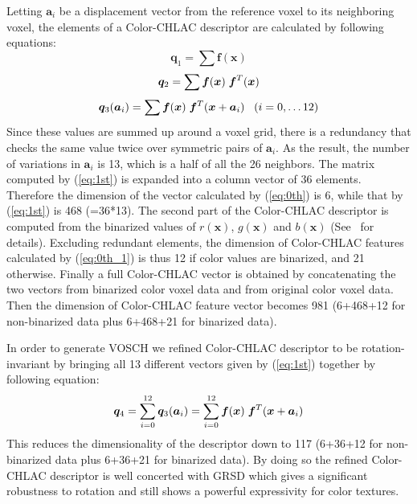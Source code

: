 \documentclass[conference]{sty/IEEEtran}
\begin{document}
%
Letting ${\bm a_i}$ be a displacement vector from the reference voxel to its neighboring voxel, 
the elements of a Color-CHLAC descriptor are calculated by following equations:
\begin{equation}\label{eq:0th}
  {\bm q_1} = \sum \bm{f}({\bm x})
\end{equation}
\begin{equation}\label{eq:0th_1}
  {\bm q_2} = \sum \bm{f}({\bm x}) \hspace{1mm}\bm{f}^T({\bm x}) \\
\end{equation}
\begin{equation}\label{eq:1st}
  {\bm q_3}({\bm a}_i) = \sum \bm{f}({\bm x}) \hspace{1mm}\bm{f}^T({\bm x}+{\bm a_i}) \;\;\; (i=0, \dots 12) \\
\end{equation}
%
Since these values are summed up around a voxel grid, there is a redundancy that checks 
the same value twice over symmetric pairs of ${\bm a_i}$. 
As the result, the number of variations in ${\bm a_i}$ is 13, which is a half of all the 26 neighbors.
The matrix computed by (\ref{eq:1st}) is expanded into a column vector of 36 elements.
Therefore the dimension of the vector calculated by (\ref{eq:0th}) is 6, while that by 
(\ref{eq:1st}) is 468 (=36*13).
The second part of the Color-CHLAC descriptor is computed from the binarized values of $r(\bm{x})$, $g(\bm{x})$ 
and $b(\bm{x})$ (See~\cite{kanezaki2010icra} for details). 
Excluding redundant elements, the dimension of Color-CHLAC features calculated by (\ref{eq:0th_1}) 
is thus 12 if color values are binarized, and 21 otherwise. 
Finally a full Color-CHLAC vector is obtained by concatenating the two vectors from binarized 
color voxel data and from original color voxel data. Then the dimension of Color-CHLAC feature vector 
becomes 981 (6+468+12 for non-binarized data plus 6+468+21 for binarized data). 

In order to generate VOSCH we refined Color-CHLAC descriptor to be rotation-invariant by bringing all  
13 different vectors given by (\ref{eq:1st}) together by following equation: 
\begin{equation}\label{eq:1st_new}
  {\bm q_4} = \sum_{i=0}^{12} {\bm q_3}({\bm a}_i) = \sum_{i=0}^{12} \bm{f}({\bm x}) \hspace{1mm}\bm{f}^T({\bm x}+{\bm a_i}) \\
\end{equation}
%
This reduces the dimensionality of the descriptor down to 117 (6+36+12 for non-binarized data plus 6+36+21 for binarized data). 
By doing so the refined Color-CHLAC descriptor is well concerted with GRSD which gives a significant 
robustness to rotation and still shows a powerful expressivity for color textures.
\end{document}
